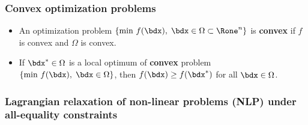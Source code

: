 \documentclass[a4paper]{article}
\begin{document}
\subsubsection*{Convex optimization problems}%

\begin{itemize}
  \item An optimization problem $\{\text{min}~f(\bdx), \; \bdx\in\Omega\subset\Rone^n\}$
    is \textbf{convex} if $f$ is convex
    and $\Omega$ is convex.
  \item If $\bdx^*\in\Omega$ is  a local optimum of \textbf{convex} problem
    $\{\text{min}~f(\bdx), \; \bdx\in\Omega\}$, then $f(\bdx)\ge f(\bdx^*)$ for all $\bdx\in\Omega$.
\end{itemize}%

\subsubsection*{Lagrangian relaxation of non-linear problems (NLP) under all-equality constraints}%
\end{document}
